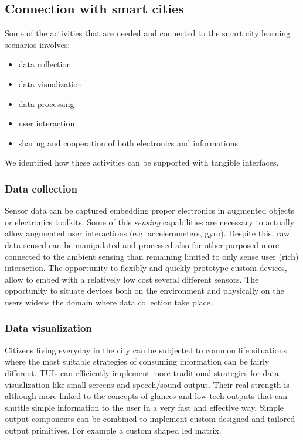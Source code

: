 \subsection{Connection with smart cities}

Some of the activities that are needed and connected to the smart city learning scenarios involves:

\begin{itemize}
\item data collection
\item data visualization
\item data processing
\item user interaction
\item sharing and cooperation of both electronics and informations
\end{itemize}

We identified how these activities can be supported with tangible interfaces.

\subsubsection{Data collection}
Sensor data can be captured embedding proper electronics in augmented objects or electronics toolkits.
Some of this \textit{sensing} capabilities are necessary to actually allow augmented user interactions (e.g. accelerometers, gyro).
Despite this, raw data sensed can be manipulated and processed also for other purposed more connected to the ambient sensing than remaining limited to only sense user (rich) interaction.
The opportunity to flexibly and quickly prototype custom devices, allow to embed with a relatively low cost several different sensors.
The opportunity to situate devices both on the environment and physically on the users widens the domain where data collection take place.

\subsubsection{Data visualization}
Citizens living everyday in the city can be subjected to common life situations where the most suitable strategies of consuming information can be fairly different.
TUIs can efficiently implement more traditional strategies for data visualization like small screens and speech/sound output. Their real strength is although more linked to the concepts of glances and low tech outputs that can shuttle simple information to the user in a very fast and effective way.
Simple output components can be combined to implement custom-designed and tailored output primitives. For example a custom shaped led matrix.

